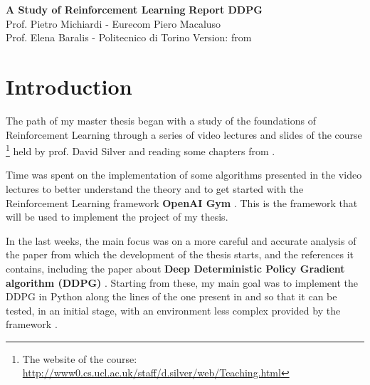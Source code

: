 \documentclass[a4paper, 11pt]{article}
\begin{document}
	\noindent
	\large\textbf{A Study of Reinforcement Learning} \hfill \textbf{Report DDPG} \\
	\normalsize Prof. Pietro Michiardi - Eurecom \hfill   Piero Macaluso\\
	\normalsize Prof. Elena Baralis - Politecnico di Torino  \hfill Version: \vhCurrentVersion \space from \vhCurrentDate
	
	\tableofcontents
	\newpage
	\begin{versionhistory}
	\end{versionhistory}
	\newpage
	
	\section{Introduction} \label{introduction}
		
	The path of my master thesis began with a study of the foundations of Reinforcement Learning through a series of video lectures and slides of the course \footnote{The website of the course: \url{http://www0.cs.ucl.ac.uk/staff/d.silver/web/Teaching.html}} held by prof. David Silver and reading some chapters from \cite{sutton2018reinforcement}. 
	
	Time was spent on the implementation of some algorithms presented in the video lectures to better understand the theory and to get started with the Reinforcement Learning framework \textbf{OpenAI Gym} \cite{brockman2016openai}. This is the framework that will be used to implement the project of my thesis.
	
	In the last weeks, the main focus was on a more careful and accurate analysis of the paper \cite{kendall2018learning} from which the development of the thesis starts, and the references it contains, including the paper about \textbf{Deep Deterministic Policy Gradient algorithm (DDPG)} \cite{lillicrap2015continuous}.
	Starting from these, my main goal was to implement the DDPG in  Python along the lines of the one present in \cite{kendall2018learning} and \cite{lillicrap2015continuous} so that it can be tested, in an initial stage, with an environment less complex provided by the framework \cite{brockman2016openai}.
	
\end{document}
